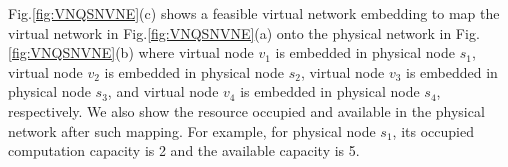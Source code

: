 Fig.\ref{fig:VNQSNVNE}(c) shows a feasible virtual network embedding to map the virtual network in Fig.\ref{fig:VNQSNVNE}(a) onto the physical network in Fig.\ref{fig:VNQSNVNE}(b) where  virtual node $v_1$ is embedded in physical node $s_1$, virtual node $v_2$ is embedded in physical node $s_2$, virtual node $v_3$ is embedded in physical node $s_3$, and virtual  node $v_4$ is embedded in physical node $s_4$, respectively.  We also show the resource occupied and available in the physical network after such  mapping. For example, for physical node $s_1$, its occupied computation capacity is 2 and the available capacity is 5. %








